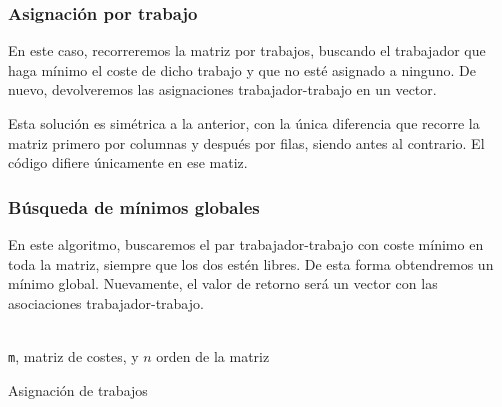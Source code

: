 \documentclass[a4paper, 11pt]{article} %
\begin{document}
	
		\subsubsection{Asignación por trabajo}
		En este caso, recorreremos la matriz por trabajos, buscando el trabajador que haga mínimo el coste de dicho trabajo y que no esté asignado a ninguno. De nuevo, devolveremos las asignaciones trabajador-trabajo en un vector. 
		
		Esta solución es simétrica a la anterior, con la única diferencia que recorre la matriz  primero por columnas 
		y después por filas, siendo antes al contrario. El código difiere únicamente en ese matiz. 
		
		\subsubsection{Búsqueda de mínimos globales}
		En este algoritmo, buscaremos el par trabajador-trabajo con coste mínimo en toda la matriz, siempre que los dos estén 
		libres. De esta forma obtendremos un mínimo global. Nuevamente, el valor de retorno será un vector con las asociaciones
		trabajador-trabajo. 
		
		\begin{algorithm}[H]
			\begin{algorithmic}[1]
				\REQUIRE \ \\
					\texttt{m}, matriz de costes, y $n$ orden de la matriz\\
			           	     \ENDIF
			           	   \ENDIF
			             \ENDFOR
			           \ENDIF
			         \ENDFOR
			       \ENDFOR  	
				        
			\end{algorithmic}
			   \caption{Asignación de trabajos}
			   \label{Asignación Global}
		\end{algorithm}
		
\end{document}
